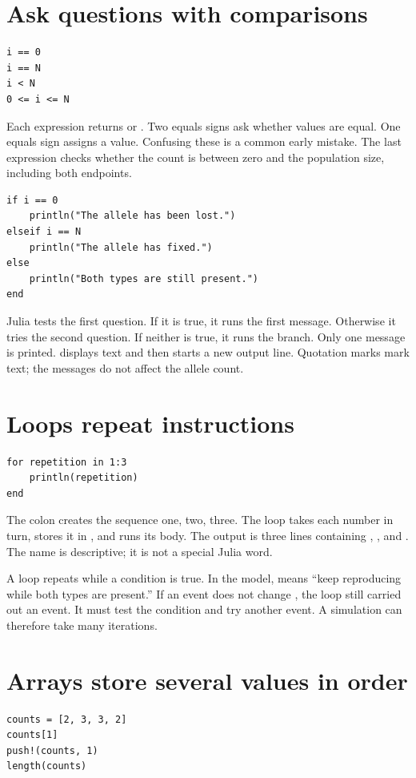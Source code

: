 \section{Ask questions with comparisons}
\begin{lstlisting}
i == 0
i == N
i < N
0 <= i <= N
\end{lstlisting}

Each expression returns  or . Two equals signs ask whether values are equal. One equals sign assigns a value. Confusing these is a common early mistake. The last expression checks whether the count is between zero and the population size, including both endpoints.

\begin{lstlisting}
if i == 0
    println("The allele has been lost.")
elseif i == N
    println("The allele has fixed.")
else
    println("Both types are still present.")
end
\end{lstlisting}

Julia tests the first question. If it is true, it runs the first message. Otherwise it tries the second question. If neither is true, it runs the  branch. Only one message is printed.  displays text and then starts a new output line. Quotation marks mark text; the messages do not affect the allele count.

\section{Loops repeat instructions}
\begin{lstlisting}
for repetition in 1:3
    println(repetition)
end
\end{lstlisting}

The colon creates the sequence one, two, three. The loop takes each number in turn, stores it in , and runs its body. The output is three lines containing , , and . The name  is descriptive; it is not a special Julia word.

A  loop repeats while a condition is true. In the model,  means ``keep reproducing while both types are present.'' If an event does not change , the loop still carried out an event. It must test the condition and try another event. A simulation can therefore take many iterations.

\section{Arrays store several values in order}
\begin{lstlisting}
counts = [2, 3, 3, 2]
counts[1]
push!(counts, 1)
length(counts)
\end{lstlisting}

